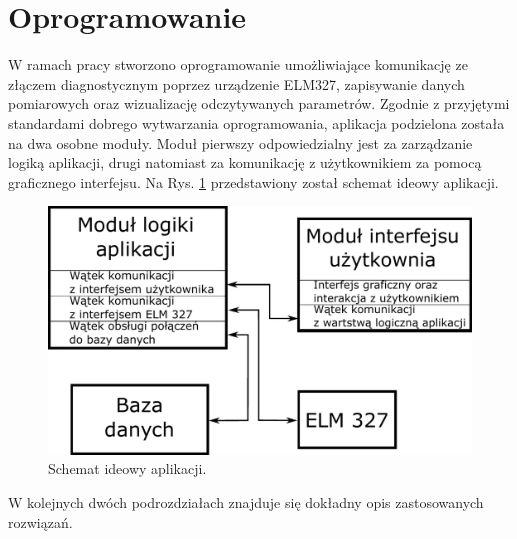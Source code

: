 \documentclass[12pt]{article} %
\numberwithin{equation}{subsection}
\numberwithin{figure}{section}
\numberwithin{table}{section}
\begin{document}
		\newpage
		
		
	
		\newpage


\section{Oprogramowanie}

\hspace{0.5cm}W ramach pracy stworzono oprogramowanie umożliwiające komunikację ze złączem diagnostycznym poprzez urządzenie ELM327, zapisywanie danych pomiarowych oraz wizualizację odczytywanych parametrów. Zgodnie z przyjętymi standardami dobrego wytwarzania oprogramowania, aplikacja podzielona została na dwa osobne moduły. Moduł pierwszy odpowiedzialny jest za zarządzanie logiką aplikacji, drugi natomiast za komunikację z użytkownikiem za pomocą graficznego interfejsu. Na Rys. \ref{rys_ogolny_schemat_aplikacji} przedstawiony został schemat ideowy aplikacji.

		\begin{figure}[!h]
			\centering
			\includegraphics[scale=0.75]{Images/rys_ogolny_schemat_aplikacji.pdf}
			\caption{Schemat ideowy aplikacji.}
			\label{rys_ogolny_schemat_aplikacji}
		\end{figure}

W kolejnych dwóch podrozdziałach znajduje się dokładny opis zastosowanych rozwiązań.

\newpage

	
\end{document}
